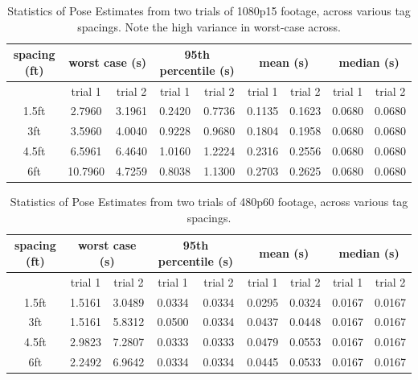 \documentclass{article}
\begin{document}
    \begin{table}[H]
      \centering
      \begin{tabular}{|c|c|c|c|c|c|c|c|c|} \hline
        spacing (ft) & \multicolumn{2}{c}{worst case (s)} & \multicolumn{2}{c}{95th percentile (s)} & \multicolumn{2}{c}{mean (s)} & \multicolumn{2}{c|}{median (s)} \\ \hline
            & trial 1 & trial 2 & trial 1 & trial 2 & trial 1 & trial 2 & trial 1 & trial 2 \\ \hline
            1.5ft & 2.7960 & 3.1961 & 0.2420 & 0.7736 & 0.1135 & 0.1623 & 0.0680 & 0.0680 \\ \hline
            3ft   & 3.5960 & 4.0040 & 0.9228 & 0.9680 & 0.1804 & 0.1958 & 0.0680 & 0.0680 \\ \hline
            4.5ft & 6.5961 & 6.4640 & 1.0160 & 1.2224 & 0.2316 & 0.2556 & 0.0680 & 0.0680 \\ \hline
            6ft   & 10.7960 & 4.7259 & 0.8038 & 1.1300 & 0.2703 & 0.2625 & 0.0680 & 0.0680 \\ \hline
      \end{tabular}
      \caption{Statistics of Pose Estimates from two trials of 1080p15 footage, across various tag spacings. Note the high variance in worst-case across.}
      \label{table:1080p15_pose_estimate_stats}
    \end{table}

    \begin{table}[H]
      \centering
      \begin{tabular}{|c|c|c|c|c|c|c|c|c|} \hline
        spacing (ft) & \multicolumn{2}{c}{worst case (s)} & \multicolumn{2}{c}{95th percentile (s)} & \multicolumn{2}{c}{mean (s)} & \multicolumn{2}{c|}{median (s)} \\ \hline
            & trial 1 & trial 2 & trial 1 & trial 2 & trial 1 & trial 2 & trial 1 & trial 2 \\ \hline
        1.5ft & 1.5161 & 3.0489 & 0.0334 & 0.0334 & 0.0295 & 0.0324 & 0.0167 & 0.0167 \\ \hline
        3ft   & 1.5161 & 5.8312 & 0.0500 & 0.0334 & 0.0437 & 0.0448 & 0.0167 & 0.0167 \\ \hline
        4.5ft & 2.9823 & 7.2807 & 0.0333 & 0.0333 & 0.0479 & 0.0553 & 0.0167 & 0.0167 \\ \hline
        6ft   & 2.2492 & 6.9642 & 0.0334 & 0.0334 & 0.0445 & 0.0533 & 0.0167 & 0.0167 \\ \hline
      \end{tabular}
      \caption{Statistics of Pose Estimates from two trials of 480p60 footage, across various tag spacings.}
      \label{table:480p60_pose_estimate_stats}
    \end{table}
\end{document}
